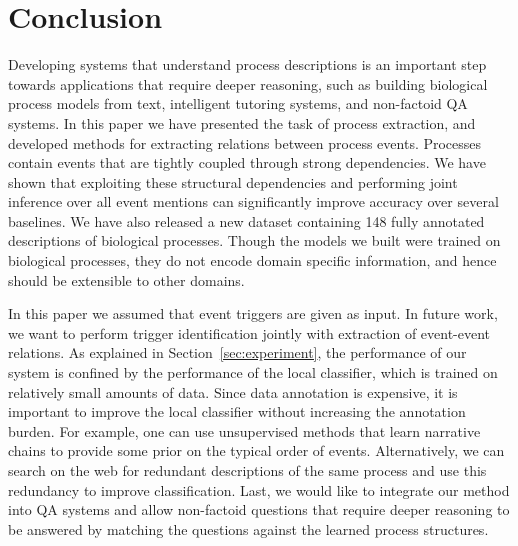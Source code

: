 \section{Conclusion}

Developing systems that understand process descriptions is an important step towards applications that require deeper reasoning, such as building biological process models from text, intelligent tutoring systems, and non-factoid QA systems. In this paper we have presented the task of process extraction, and developed methods for extracting relations between process events. Processes contain events that are  tightly coupled through strong dependencies. We have shown that  exploiting these structural dependencies and performing joint inference over all event mentions can significantly improve accuracy over several baselines. We have also released a new dataset containing 148 fully annotated descriptions of biological processes. Though the models we built were trained on biological processes, they do not encode domain specific information, and hence should be extensible to other domains.

In this paper we assumed that event triggers are given as input. In future work, we want to perform trigger identification jointly with extraction of event-event relations. As explained in Section~\ref{sec:experiment}, the performance of our system is confined by the performance of the local classifier, which is trained on relatively small amounts of data. Since data annotation is expensive, it is important to improve the local classifier without increasing the annotation burden. For example, one can use unsupervised methods that learn narrative chains \cite{Chambers11} to provide some prior on the typical order of events. Alternatively, we can search on the web for redundant descriptions of the same process and use this redundancy to improve classification. Last, we would like to integrate our method into QA systems and allow non-factoid questions that require deeper reasoning to be answered by matching the questions against the learned process structures.